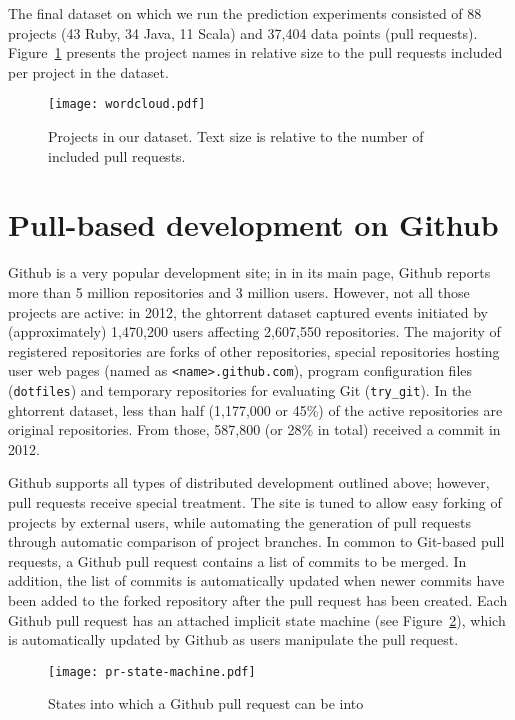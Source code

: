 \documentclass{sig-alternate}
\begin{document}
The final dataset on which we run the prediction experiments consisted of 88
projects (43 Ruby, 34 Java, 11 Scala) and 37,404 data points (pull requests).
Figure~\ref{fig:wordcloud} presents the project names in relative size to the
pull requests included per project in the dataset. 

\begin{figure}
  \begin{center}
    \texttt{[image: wordcloud.pdf]}
  \end{center}
  \caption{Projects in our dataset. Text size is relative to the number of
  included pull requests.}
  \label{fig:wordcloud}
\end{figure}

\section{Pull-based development on Github}

Github is a very popular development site; in in its main page, Github reports
more than 5 million repositories and 3 million users. However,  not all those
projects are active: in 2012, the {\sc ght}orrent dataset captured events initiated by
(approximately) 1,470,200 users affecting 2,607,550 repositories. The majority
of registered repositories are forks of other repositories, special repositories
hosting user web pages (named as \texttt{<name>.github.com}), program
configuration files (\texttt{dotfiles}) and temporary repositories for
evaluating Git (\texttt{try\_git}). In the {\sc ght}orrent dataset, less than half
(1,177,000 or 45\%) of the active repositories are original repositories. From
those, 587,800 (or 28\% in total) received a commit in 2012.

Github supports all types of distributed development outlined above; however,
pull requests receive special treatment. The site is tuned to allow easy forking
of projects by external users, while automating the generation of pull
requests through automatic comparison of project branches. In common to
Git-based pull requests, a Github pull request contains a list of commits
to be merged. In addition, the list of commits is automatically updated when newer commits have been added to the forked repository after the pull request
has been created. Each Github pull request has an attached implicit state
machine (see Figure~\ref{fig:state}), which is automatically updated by
Github as users manipulate the pull request.

\begin{figure}
  \begin{center}
    \texttt{[image: pr-state-machine.pdf]}
  \end{center}
  \caption{States into which a Github pull request can be into}
  \label{fig:state}
\end{figure}
\end{document}
